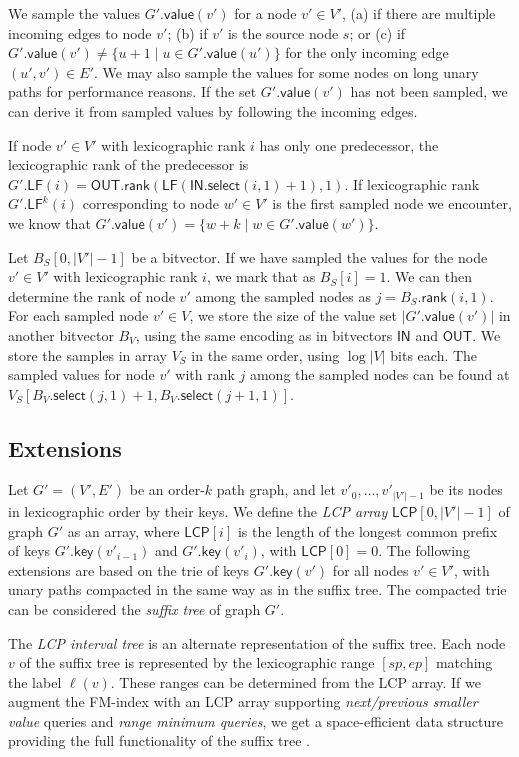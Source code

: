 \documentclass[a4paper,UKenglish]{lipics-v2016}
\newcommand{\set}[1]{\ensuremath{\{ #1 \}}}
\newcommand{\abs}[1]{\ensuremath{\lvert #1 \rvert}}
\newcommand{\rank}{\ensuremath{\mathsf{rank}}}
\newcommand{\select}{\ensuremath{\mathsf{select}}}
\newcommand{\LF}{\ensuremath{\mathsf{LF}}}
\newcommand{\gkey}{\ensuremath{\mathsf{key}}}
\newcommand{\gvalue}{\ensuremath{\mathsf{value}}}
\newcommand{\orderk}[1]{order\nobreakdash-$#1$}
\newcommand{\LCP}{\ensuremath{\mathsf{LCP}}}
\newcommand{\bvIN}{\ensuremath{\mathsf{IN}}}
\newcommand{\bvOUT}{\ensuremath{\mathsf{OUT}}}
\begin{document}
We sample the values $G'.\gvalue(v')$ for a node $v' \in V'$, (a) if there are multiple incoming edges to node $v'$; (b) if $v'$ is the source node $s$; or (c) if $G'.\gvalue(v') \ne \set{u+1 \mid u \in G'.\gvalue(u')}$ for the only incoming edge $(u', v') \in E'$. We may also sample the values for some nodes on long unary paths for performance reasons. If the set $G'.\gvalue(v')$ has not been sampled, we can derive it from sampled values by following the incoming edges.

If node $v' \in V'$ with lexicographic rank $i$ has only one predecessor, the lexicographic rank of the predecessor is $G'.\LF(i) = \bvOUT.\rank(\LF(\bvIN.\select(i, 1) + 1), 1)$. If lexicographic rank $G'.\LF^{k}(i)$ corresponding to node $w' \in V'$ is the first sampled node we encounter, we know that $G'.\gvalue(v') = \set{w+k \mid w \in G'.\gvalue(w')}$.

Let $B_{S}[0, \abs{V'}-1]$ be a bitvector. If we have sampled the values for the node $v' \in V'$ with lexicographic rank $i$, we mark that as $B_{S}[i] = 1$. We can then determine the rank of node $v'$ among the sampled nodes as $j = B_{S}.\rank(i, 1)$. For each sampled node $v' \in V$, we store the size of the value set $\abs{G'.\gvalue(v')}$ in another bitvector $B_{V}$, using the same encoding as in bitvectors $\bvIN$ and $\bvOUT$. We store the samples in array $V_{S}$ in the same order, using $\log \abs{V}$ bits each. The sampled values for node $v'$ with rank $j$ among the sampled nodes can be found at $V_{S}[B_{V}.\select(j, 1) + 1, B_{V}.\select(j+1, 1)]$.

\subsection{Extensions}\label{sect:extensions}

Let $G' = (V', E')$ be an \orderk{k} path graph, and let $v'_{0}, \dotsc, v'_{\abs{V'}-1}$ be its nodes in lexicographic order by their keys. We define the \emph{LCP array} $\LCP[0, \abs{V'}-1]$ of graph $G'$ as an array, where $\LCP[i]$ is the length of the longest common prefix of keys $G'.\gkey(v'_{i-1})$ and $G'.\gkey(v'_{i})$, with $\LCP[0] = 0$. The following extensions are based on the trie of keys $G'.\gkey(v')$ for all nodes $v' \in V'$, with unary paths compacted in the same way as in the suffix tree. The compacted trie can be considered the \emph{suffix tree} of graph $G'$.

The \emph{LCP interval tree} \cite{Abouelhoda2004} is an alternate representation of the suffix tree. Each node $v$ of the suffix tree is represented by the lexicographic range $[sp, ep]$ matching the label $\ell(v)$. These ranges can be determined from the LCP array. If we augment the FM\nobreakdash-index with an LCP array supporting \emph{next/previous smaller value} queries and \emph{range minimum queries}, we get a space-efficient data structure providing the full functionality of the suffix tree \cite{Fischer2009a}.
\end{document}

